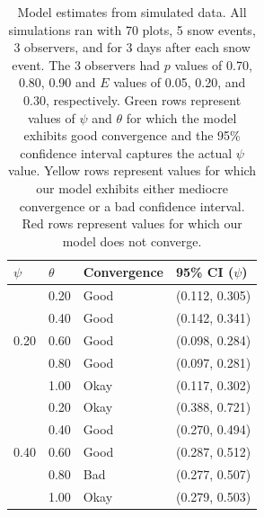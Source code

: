 \documentclass[12pt]{article}
\begin{document}
    \begin{table}
    \caption{Model estimates from simulated data. All simulations
    ran with 70 plots, 5 snow events, 3 observers, and for 3 days after each
    snow event. The 3 observers had \(p\) values of 0.70, 0.80, 0.90 and \(E\)
    values of 0.05, 0.20, and 0.30, respectively. Green rows represent values of
    \(\psi\) and \(\theta\) for which the model exhibits good convergence and
    the 95\% confidence interval captures the actual \(\psi\) value.  Yellow
    rows represent values for which our model exhibits either mediocre
    convergence or a bad confidence interval.  Red rows represent values for
    which our model does not converge.}
    \label{Simulated data}
    \begin{center}
    \begin{tabular}{|l|l|l|l|}
        \hline
            \(\psi\) & \(\theta\) & Convergence & 95\% CI (\(\psi\)) \\
        \hline
        \multirow{5}{*}{0.20}
            & \cellcolor{Green}0.20 & \cellcolor{Green}Good &
              \cellcolor{Green}(0.112, 0.305) \\
            & \cellcolor{Green}0.40 & \cellcolor{Green}Good &
              \cellcolor{Green}(0.142, 0.341) \\
            & \cellcolor{Green}0.60 & \cellcolor{Green}Good &
              \cellcolor{Green}(0.098, 0.284) \\
            & \cellcolor{Green}0.80 & \cellcolor{Green}Good &
              \cellcolor{Green}(0.097, 0.281) \\
            & \cellcolor{Yellow}1.00 & \cellcolor{Yellow}Okay &
              \cellcolor{Yellow}(0.117, 0.302) \\
        \hline
        \multirow{5}{*}{0.40}
            & \cellcolor{Yellow}0.20 & \cellcolor{Yellow}Okay &
              \cellcolor{Yellow}(0.388, 0.721) \\
            & \cellcolor{Green}0.40 & \cellcolor{Green}Good &
              \cellcolor{Green}(0.270, 0.494) \\
            & \cellcolor{Green}0.60 & \cellcolor{Green}Good &
              \cellcolor{Green}(0.287, 0.512) \\
            & \cellcolor{Red}0.80 & \cellcolor{Red}Bad &
              \cellcolor{Red}(0.277, 0.507) \\
            & \cellcolor{Yellow}1.00 & \cellcolor{Yellow}Okay &
              \cellcolor{Yellow}(0.279, 0.503) \\
        \hline

\end{tabular}
\end{center}
\end{table}
\end{document}
